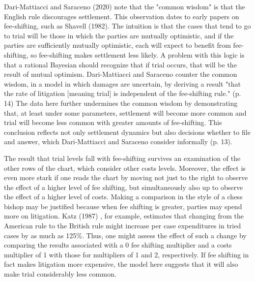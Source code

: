 \documentclass{article}
\begin{document}
Dari-Mattiacci and Saraceno (2020) note that the "common wisdom" is that the English rule discourages settlement. This observation dates to early papers on fee-shifting, such as Shavell (1982). The intuition is that the cases that tend to go to trial will be those in which the parties are mutually optimistic, and if the parties are sufficiently mutually optimistic, each will expect to benefit from fee-shifting, so fee-shifting makes settlement less likely. A problem with this logic is that a rational Bayesian should recognize that if trial occurs, that will be the result of mutual optimism. Dari-Mattiacci and Saraceno counter the common wisdom, in a model in which damages are uncertain, by deriving a result "that the rate of litigation [meaning trial] is independent of the fee-shifting rule." (p. 14) The data here further undermines the common wisdom by demonstrating that, at least under some parameters, settlement will become more common and trial will become less common with greater amounts of fee-shifting. This conclusion reflects not only settlement dynamics but also decisions whether to file and answer, which Dari-Mattiacci and Saraceno consider informally (p. 13). 

The result that trial levels fall with fee-shifting survives an examination of the other rows of the chart, which consider other costs levels. Moreover, the effect is even more stark if one reads the chart by moving not just to the right to observe the effect of a higher level of fee shifting, but simultaneously also up to observe the effect of a higher level of costs. Making a comparison in the style of a chess bishop may be justified because when fee shifting is greater, parties may spend more on litigation. Katz (1987) \cite{katz}, for example, estimates that changing from the American rule to the British rule might increase per case expenditures in tried cases by as much as 125\%. Thus, one might assess the effect of such a change by comparing the results associated with a 0 fee shifting multiplier and a costs multiplier of 1 with those for multipliers of 1 and 2, respectively. If fee shifting in fact makes litigation more expensive, the model here suggests that it will also make trial considerably less common.
\end{document}
